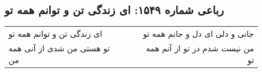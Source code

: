 \begin{center}
\section*{رباعی شماره ۱۵۴۹: ای زندگی تن و توانم همه تو}
\label{sec:1549}
\begin{longtable}{l p{0.5cm} r}
ای زندگی تن و توانم همه تو
&&
جانی و دلی ای دل و جانم همه تو
\\
تو هستی من شدی از آنی همه من
&&
من نیست شدم در تو از آنم همه تو
\\
\end{longtable}
\end{center}
